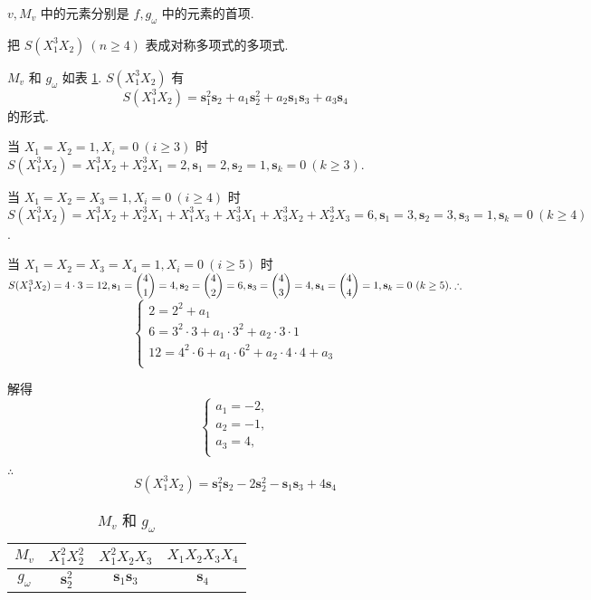 \documentclass[UTF8]{ctexart}
\begin{document}
$v,M_v$ 中的元素分别是 $f,g_\omega$ 中的元素的首项.
\begin{example}
    把 $S(X_1^3X_2)\ (n\geq4)$ 表成对称多项式的多项式.
\end{example}
\begin{solution}
    $M_v$ 和 $g_\omega$ 如表 \ref{tb1}. $S(X_1^3X_2)$ 有
    \[S(X_1^3X_2)=\mathbf{s}_1^2\mathbf{s}_2+a_1\mathbf{s}_2^2+a_2\mathbf{s}_1\mathbf{s}_3+a_3\mathbf{s}_4\]
    的形式.

    当 $X_1=X_2=1,X_i=0\ (i\geq3)$ 时 $S(X_1^3X_2)=X_1^3X_2+X_2^3X_1=2,\mathbf{s}_1=2,\mathbf{s}_2=1,\mathbf{s}_k=0\ (k\geq3)$.

    当 $X_1=X_2=X_3=1,X_i=0\ (i\geq4)$ 时 $S(X_1^3X_2)=X_1^3X_2+X_2^3X_1+X_1^3X_3+X_3^3X_1+X_3^3X_2+X_2^3X_3=6,\mathbf{s}_1=3,\mathbf{s}_2=3,\mathbf{s}_3=1,\mathbf{s}_k=0\ (k\geq4)$.

    当 $X_1=X_2=X_3=X_4=1,X_i=0\ (i\geq5)$ 时 $S(X_1^3X_2)=4\cdot3=12,\mathbf{s}_1=\dbinom{4}{1}=4,\mathbf{s}_2=\dbinom{4}{2}=6,\mathbf{s}_3=\dbinom{4}{3}=4,\mathbf{s}_4=\dbinom{4}{4}=1,\mathbf{s}_k=0\ (k\geq5).\therefore$
    \[\begin{cases}
        2=2^2+a_1 \\
        6=3^2\cdot3+a_1\cdot3^2+a_2\cdot3\cdot1 \\
        12=4^2\cdot6+a_1\cdot6^2+a_2\cdot4\cdot4+a_3 \\
    \end{cases}\]

    解得
    \[\begin{cases}
        a_1=-2, \\
        a_2=-1, \\
        a_3=4, \\
    \end{cases}\]

    $\therefore$
    \[S(X_1^3X_2)=\mathbf{s}_1^2\mathbf{s}_2-2\mathbf{s}_2^2-\mathbf{s}_1\mathbf{s}_3+4\mathbf{s}_4\]
    \begin{table}\caption{$M_v$ 和 $g_\omega$}\label{tb1}
        \begin{center}
            \begin{tabular}{c|ccc}
                $M_v$      & $X_1^2X_2^2$ & $X_1^2X_2X_3$ & $X_1X_2X_3X_4$ \\
                \hline
                $g_\omega$ & $\mathbf{s}_2^2$ & $\mathbf{s}_1\mathbf{s}_3$ & $\mathbf{s}_4$ \\
            \end{tabular}
        \end{center}
    \end{table}
\end{solution}
\end{document}
